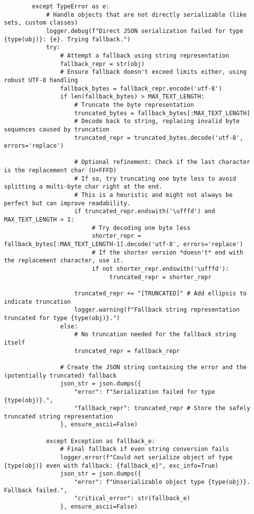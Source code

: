 \documentclass[12pt,a4paper]{article}
\begin{document}
\begin{pageablecode}
\begin{verbatim}
        except TypeError as e:
            # Handle objects that are not directly serializable (like sets, custom classes)
            logger.debug(f"Direct JSON serialization failed for type {type(obj)}: {e}. Trying fallback.")
            try:
                # Attempt a fallback using string representation
                fallback_repr = str(obj)
                # Ensure fallback doesn't exceed limits either, using robust UTF-8 handling
                fallback_bytes = fallback_repr.encode('utf-8')
                if len(fallback_bytes) > MAX_TEXT_LENGTH:
                    # Truncate the byte representation
                    truncated_bytes = fallback_bytes[:MAX_TEXT_LENGTH]
                    # Decode back to string, replacing invalid byte sequences caused by truncation
                    truncated_repr = truncated_bytes.decode('utf-8', errors='replace')

                    # Optional refinement: Check if the last character is the replacement char (U+FFFD)
                    # If so, try truncating one byte less to avoid splitting a multi-byte char right at the end.
                    # This is a heuristic and might not always be perfect but can improve readability.
                    if truncated_repr.endswith('\ufffd') and MAX_TEXT_LENGTH > 1:
                         # Try decoding one byte less
                         shorter_repr = fallback_bytes[:MAX_TEXT_LENGTH-1].decode('utf-8', errors='replace')
                         # If the shorter version *doesn't* end with the replacement character, use it.
                         if not shorter_repr.endswith('\ufffd'):
                              truncated_repr = shorter_repr

                    truncated_repr += "[TRUNCATED]" # Add ellipsis to indicate truncation
                    logger.warning(f"Fallback string representation truncated for type {type(obj)}.")
                else:
                    # No truncation needed for the fallback string itself
                    truncated_repr = fallback_repr

                # Create the JSON string containing the error and the (potentially truncated) fallback
                json_str = json.dumps({
                    "error": f"Serialization failed for type {type(obj)}.",
                    "fallback_repr": truncated_repr # Store the safely truncated string representation
                }, ensure_ascii=False)

            except Exception as fallback_e:
                # Final fallback if even string conversion fails
                logger.error(f"Could not serialize object of type {type(obj)} even with fallback: {fallback_e}", exc_info=True)
                json_str = json.dumps({
                    "error": f"Unserializable object type {type(obj)}. Fallback failed.",
                    "critical_error": str(fallback_e)
                }, ensure_ascii=False)


\end{verbatim}
\end{pageablecode}
\end{document}
